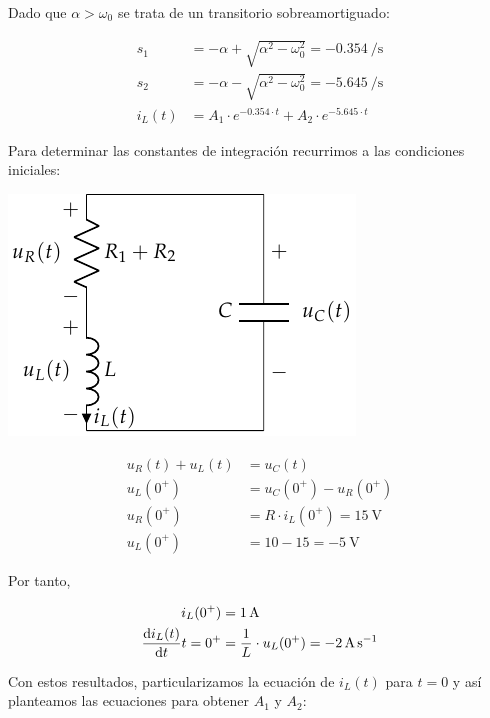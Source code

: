 \documentclass[12pt]{article}
\begin{document}
\bigskip

Dado que $\alpha > \omega_0$ se trata de un transitorio sobreamortiguado:

\begin{align*}
  s_1 &= -\alpha + \sqrt{\alpha^2 - \omega_0^2} = \SI{-0.354}{\per\second}\\
  s_2 &= -\alpha - \sqrt{\alpha^2 - \omega_0^2} = \SI{-5.645}{\per\second}\\
  i_L(t) &= A_1 \cdot e^{-0.354 \cdot t} + A_2 \cdot e^{-5.645 \cdot t}
\end{align*}

Para determinar las constantes de integración recurrimos a las condiciones iniciales:

\bigskip

\begin{minipage}{0.3\textwidth}
\includegraphics[scale=0.8]{figs/FM_4_8_natural}
\end{minipage}
\begin{minipage}{0.7\textwidth}
  \begin{align*}
    u_R(t) + u_L(t) &= u_C(t)\\
    u_L(0^+) &= u_C(0^+) - u_R(0^+)\\
    u_R(0^+) &= R \cdot i_L(0^+) = \SI{15}{\volt}\\
    u_L(0^+) &= 10 - 15 = \SI{-5}{\volt}
  \end{align*}
\end{minipage}

\bigskip

Por tanto,

\begin{align*}
  i_L(0^+) &= \SI{1}{\ampere}\\
  \diff{i_L(t)}{t}{t = 0^+} &= \frac{1}{L} \cdot u_L(0^+) = \SI{-2}{\ampere\per\second}
\end{align*}

Con estos resultados, particularizamos la ecuación de $i_L(t)$ para $t = 0$ y así planteamos las ecuaciones para obtener $A_1$ y $A_2$:
\end{document}
